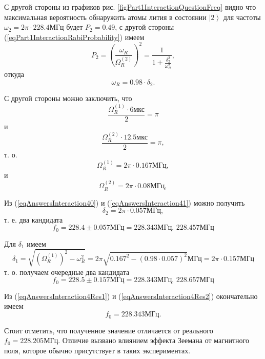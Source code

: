 С другой стороны из графиков
рис. \ref{figPart1InteractionQuestionFreq} видно что максимальная
вероятность обнаружить атомы лития в состоянии $\left|2\right>$ для
частоты $\omega_2 = 2 \pi \cdot 228.4 \mbox{МГц}$ будет $P_2 = 0.49$,
с другой стороны (\ref{eqPart1InteractionRabiProbability}) имеем
\begin{equation}
  P_2 = \left(\frac{\omega_R}{\Omega_R^{(2)}}\right)^2 =
  \frac{1}{1 + \frac{\delta_2^2}{\omega_R^2}},
  \nonumber
\end{equation}
откуда
\begin{equation}
  \omega_R = 0.98 \cdot \delta_2 .
  \label{eqAnswersInteraction41}
\end{equation}

С другой стороны можно заключить, что
\[
\frac{\Omega_R^{(1)} \cdot 6 \mbox{мкс}}{2} = \pi
\]
и
\[
\frac{\Omega_R^{(2)} \cdot 12.5 \mbox{мкс}}{2} = \pi,
\]
т. о.
\[
\Omega_R^{(1)} = 2 \pi \cdot 0.167 \mbox{МГц},
\]
и
\[
\Omega_R^{(2)} = 2 \pi \cdot 0.08 \mbox{МГц},
\]

Из (\ref{eqAnswersInteraction40}) и  (\ref{eqAnswersInteraction41})
можно получить
\[
\delta_2 = 2 \pi \cdot 0.057 \mbox{МГц},
\]
т. е. два кандидата
\begin{equation}
  f_0 = 228.4 \pm 0.057 \mbox{МГц} = 228.343 \mbox{МГц},\,
  228.457 \mbox{МГц} 
\label{eqAnswersInteraction4Res1}
\end{equation}

Для $\delta_1$ имеем
\[
\delta_1 = \sqrt{\left(\Omega_R^{(1)}\right)^2 - \omega_R^2} =
2 \pi \sqrt{0.167^2 - (0.98 \cdot 0.057)^2} \mbox{МГц} =
2 \pi \cdot 0.157 \mbox{МГц}
\]
т. о. получаем очередные два кандидата
\begin{equation}
  f_0 = 228.5 \pm 0.157 \mbox{МГц} = 228.343 \mbox{МГц},\,
  228.657 \mbox{МГц} 
\label{eqAnswersInteraction4Res2}
\end{equation}

Из (\ref{eqAnswersInteraction4Res1}) и
(\ref{eqAnswersInteraction4Res2}) окончательно имеем
\[
f_0 = 228.343 \mbox{МГц}.
\]

Стоит отметить, что полученное значение отличается от реального $f_0 =
228.205 \mbox{МГц}$. Отличие вызвано влиянием эффекта Зеемана от
магнитного поля, которое обычно присутствует в таких экспериментах.



